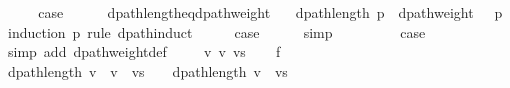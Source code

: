 \begin{isabellebody}
\ \ \isamarkupfalse%
\ \isamarkupfalse%
\ {\isacharquery}{\kern0pt}case\isanewline
\ \ \ \ \isacommand{{\isachardot}{\kern0pt}}\isamarkupfalse%
\isanewline
{}\isamarkupfalse%
%
\endisatagproof
{\isafoldproof}%
%
\isadelimproof
\isanewline
%
\endisadelimproof
%
\isadeliminvisible
\isanewline
%
\endisadeliminvisible
%
\isataginvisible
{}\isamarkupfalse%
\ dpath{\isacharunderscore}{\kern0pt}length{\isacharunderscore}{\kern0pt}eq{\isacharunderscore}{\kern0pt}dpath{\isacharunderscore}{\kern0pt}weight{\isacharcolon}{\kern0pt}\isanewline
\ \ \ {\isachardoublequoteopen}dpath{\isacharunderscore}{\kern0pt}length\ p\ {\isacharequal}{\kern0pt}\ dpath{\isacharunderscore}{\kern0pt}weight\ {\isacharparenleft}{\kern0pt}{\isasymlambda}{\isacharunderscore}{\kern0pt}{\isachardot}{\kern0pt}\ {}{\isacharparenright}{\kern0pt}\ p{\isachardoublequoteclose}%
\endisataginvisible
{\isafoldinvisible}%
%
\isadeliminvisible
\isanewline
%
\endisadeliminvisible
%
\isadelimproof
%
\endisadelimproof
%
\isatagproof
{}\isamarkupfalse%
\ {\isacharparenleft}{\kern0pt}induction\ p\ rule{\isacharcolon}{\kern0pt}\ dpath{\isacharunderscore}{\kern0pt}induct{\isacharparenright}{\kern0pt}\isanewline
{}\isamarkupfalse%
\ {}\isanewline
\ \ \isamarkupfalse%
\ {\isacharquery}{\kern0pt}case\isanewline
\ \ \ \ \isamarkupfalse%
\ simp\isanewline
{}\isamarkupfalse%
\isanewline
\ \ \isamarkupfalse%
\ {\isacharparenleft}{\kern0pt}{}\ {\isacharunderscore}{\kern0pt}{\isacharparenright}{\kern0pt}\isanewline
\ \ \isamarkupfalse%
\ {\isacharquery}{\kern0pt}case\isanewline
\ \ \ \ \isamarkupfalse%
\ {\isacharparenleft}{\kern0pt}simp\ add{\isacharcolon}{\kern0pt}\ dpath{\isacharunderscore}{\kern0pt}weight{\isacharunderscore}{\kern0pt}def{\isacharparenright}{\kern0pt}\isanewline
{}\isamarkupfalse%
\isanewline
\ \ \isamarkupfalse%
\ {\isacharparenleft}{\kern0pt}{}\ v\ v{\isacharprime}{\kern0pt}\ vs{\isacharparenright}{\kern0pt}\isanewline
\ \ \isamarkupfalse%
\ {\isacharquery}{\kern0pt}f\ {\isacharequal}{\kern0pt}\ {\isachardoublequoteopen}{\isacharparenleft}{\kern0pt}{\isasymlambda}{\isacharunderscore}{\kern0pt}{\isachardot}{\kern0pt}\ {}{\isacharparenright}{\kern0pt}{\isachardoublequoteclose}\isanewline
\ \ \isamarkupfalse%
\ {\isachardoublequoteopen}dpath{\isacharunderscore}{\kern0pt}length\ {\isacharparenleft}{\kern0pt}v\ {\isacharhash}{\kern0pt}\ v{\isacharprime}{\kern0pt}\ {\isacharhash}{\kern0pt}\ vs{\isacharparenright}{\kern0pt}\ {\isacharequal}{\kern0pt}\ {}\ {\isacharplus}{\kern0pt}\ dpath{\isacharunderscore}{\kern0pt}length\ {\isacharparenleft}{\kern0pt}v{\isacharprime}{\kern0pt}\ {\isacharhash}{\kern0pt}\ vs{\isacharparenright}{\kern0pt}{\isachardoublequoteclose}\isanewline

\end{isabellebody}

